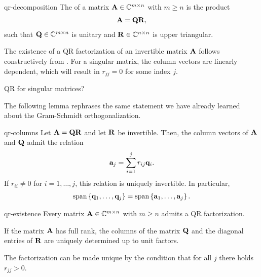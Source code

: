 \begin{Definition}{qr-decomposition}
  The  of a matrix $\mathbf A\in\mathbb C^{m\times n}$
  with $m\ge n$ is the product
  \begin{gather}
    \mathbf A = \mathbf Q\mathbf R,
  \end{gather}
  such that $\mathbf Q \in\mathbb C^{m\times n}$ is unitary and
  $\mathbf R\in \mathbb C^{n\times n}$ is upper triangular.
\end{Definition}

\begin{intro}
  The existence of a QR factorization of an invertible matrix $\mathbf A$
  follows constructively from . For a
  singular matrix, the column vectors are linearly dependent, which
  will result in $r_{jj}=0$ for some index $j$.
\begin{todo} %
    QR for singular matrices?
\end{todo}
  The following lemma rephrases the same statement we have already
  learned about the Gram-Schmidt orthogonalization.
\end{intro}

\begin{Lemma}{qr-columns}
  Let $\mathbf A = \mathbf Q\mathbf R$ and let $\mathbf R$ be invertible. Then, the
  column vectors of $\mathbf A$ and $\mathbf Q$ admit the relation
  \begin{gather}
    \mathbf a_j = \sum_{i=1}^j r_{ij} \mathbf q_i.
  \end{gather}
  If $r_{ii}\neq 0$ for $i=1,\dots,j$, this relation is uniquely
  invertible. In particular,
  \begin{gather}
    \operatorname{span}\left\{\mathbf q_1,\dots,\mathbf q_j\right\}
    =
    \operatorname{span}\left\{\mathbf a_1,\dots,\mathbf a_j\right\}.
  \end{gather}
\end{Lemma}

\begin{Theorem}{qr-existence}
  Every matrix $\mathbf A\in\mathbb C^{m\times n}$ with $m\ge n$
  admits a QR factorization.

  If the matrix $\mathbf A$ has full rank, the columns of the matrix
  $\mathbf Q$ and the diagonal entries of $\mathbf R$ are uniquely determined
  up to unit factors.

  The factorization can be made unique by the condition that for all
  $j$ there holds $r_{jj} > 0$.
\end{Theorem}


